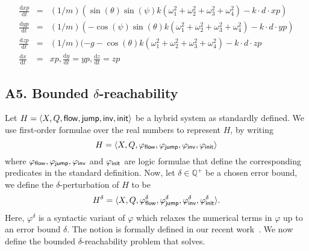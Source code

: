{\begin{eqnarray*}
\frac{\mathrm{d}{xp}}{\mathrm{d}t} &=& (1/m)(\sin(\theta)\sin(\psi)k(\omega_1^2 + \omega_2^2 +\omega_3^2+\omega_4^2) - k\cdot d\cdot{xp})\\
\frac{\mathrm{d}{yp}}{\mathrm{d}t} &=& (1/m)(-\cos(\psi)\sin(\theta)k(\omega_1^2 + \omega_2^2 +\omega_3^2+\omega_4^2) - k\cdot d\cdot{yp})\\
\frac{\mathrm{d}{zp}}{\mathrm{d}t} &=& (1/m)(-g-\cos(\theta)k(\omega_1^2 + \omega_2^2 +\omega_3^2+\omega_4^2) - k\cdot d\cdot{zp}\\
\frac{\mathrm{d}x}{\mathrm{d}t} &=& {xp}, \frac{\mathrm{d}y}{\mathrm{d}t} = {yp}, \frac{\mathrm{d}z}{\mathrm{d}t} = {zp}
\end{eqnarray*}

\subsection*{A5. Bounded $\delta$-reachability}\label{sec:delta-reachability}
Let $H = \langle X, Q, \mathsf{flow}, \mathsf{jump}, \mathsf{inv}, \mathsf{init}\rangle$ be a hybrid
system as standardly defined. We use first-order formulae over the
real numbers to represent $H$, by writing $$H = \langle X, Q,
\varphi_{\mathsf{flow}}, \varphi_{\mathsf{jump}}, \varphi_{\mathsf{inv}},
\varphi_{\mathsf{init}}\rangle$$ where $\varphi_{\mathsf{flow}}, \varphi_{\mathsf{jump}},
\varphi_{\mathsf{inv}}$ and $\varphi_{\mathsf{init}}$ are logic formulae that define
the corresponding predicates in the standard definition. Now, let
$\delta\in \mathbb{Q}^+$ be a chosen error bound, we define the
$\delta$-perturbation of $H$ to be $$H^{\delta} = \langle X, Q,
\varphi_{\mathsf{flow}}^{\delta}, \varphi_{\mathsf{jump}}^{\delta},
\varphi_{\mathsf{inv}}^{\delta}, \varphi_{\mathsf{init}}^{\delta}\rangle.$$ Here,
$\varphi^{\delta}$ is a syntactic variant of $\varphi$ which relaxes
the numerical terms in $\varphi$ up to an error bound $\delta$. The
notion is formally defined in our recent
work~\cite{DBLP:conf/cade/GaoAC12,DBLP:journals/corr/GaoKCC14}.
We now define the bounded $\delta$-reachability problem that \dReach{}
solves.

}
